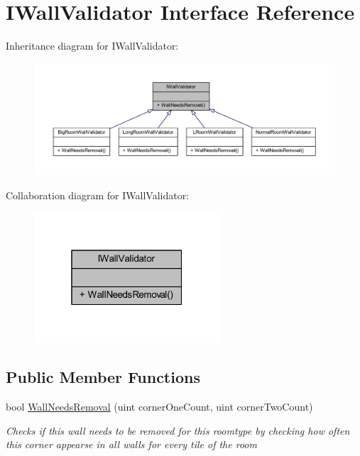 \hypertarget{interface_i_wall_validator}{}\section{I\+Wall\+Validator Interface Reference}
\label{interface_i_wall_validator}


Inheritance diagram for I\+Wall\+Validator\+:\nopagebreak
\begin{figure}[H]
\begin{center}
\leavevmode
\includegraphics[width=350pt]{interface_i_wall_validator__inherit__graph}
\end{center}
\end{figure}


Collaboration diagram for I\+Wall\+Validator\+:\nopagebreak
\begin{figure}[H]
\begin{center}
\leavevmode
\includegraphics[width=196pt]{interface_i_wall_validator__coll__graph}
\end{center}
\end{figure}
\subsection*{Public Member Functions}
\begin{DoxyCompactItemize}
\item 
bool \mbox{\hyperlink{interface_i_wall_validator_a1618acf45bf2614985aeb8b240bf7da8}{Wall\+Needs\+Removal}} (uint corner\+One\+Count, uint corner\+Two\+Count)
\begin{DoxyCompactList}\small\item\em Checks if this wall needs to be removed for this roomtype by checking how often this corner appearse in all walls for every tile of the room \end{DoxyCompactList}\end{DoxyCompactItemize}


